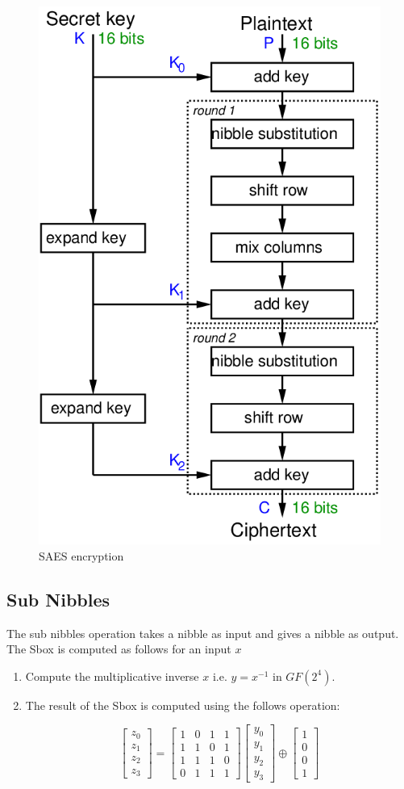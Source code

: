 \documentclass[preprint]{transcrypto}
\begin{document}
\begin{figure}[h!]
    \centering
    \includegraphics[width=0.5\linewidth]{saes/saes-encryption.png}
    \caption{SAES encryption \cite{Gordon}}
    \label{fig:saes-encryption}
\end{figure}


\subsection{Sub Nibbles}
The sub nibbles operation takes a nibble as input and gives a nibble as output. The Sbox is computed as follows for an input $x$
\begin{enumerate}
    \item Compute the multiplicative inverse $x$ i.e. $y = x^{-1}$ in $GF(2^4)$.
    \item The result of the Sbox is computed using the follows operation:
    
    \begin{equation}\label{eq:sn}
        \begin{bmatrix}
        z_0\\
        z_1\\ 
        z_2\\
        z_3
        \end{bmatrix} = 
        \begin{bmatrix}
        1 & 0 & 1 & 1\\
        1 & 1 & 0 & 1 \\
        1 & 1 & 1 & 0 \\
        0 & 1 & 1 & 1
        \end{bmatrix} 
        \begin{bmatrix}
        y_0 \\ y_1\\
        y_2 \\ y_3
        \end{bmatrix} 
        \oplus
        \begin{bmatrix}
        1  \\ 0\\
        0 \\ 1
        \end{bmatrix} 
    \end{equation}
\end{enumerate}
\end{document}
